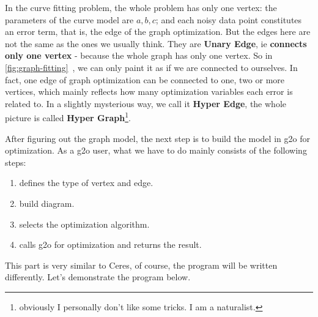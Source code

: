    In the curve fitting problem, the whole problem has only one vertex: the parameters of the curve model are $a, b, c$; and each noisy data point constitutes an error term, that is, the edge of the graph optimization. But the edges here are not the same as the ones we usually think. They are \textbf{Unary Edge}, ie \textbf{connects only one vertex} - because the whole graph has only one vertex. So in \autoref{fig:graph-fitting}~, we can only paint it as if we are connected to ourselves. In fact, one edge of graph optimization can be connected to one, two or more vertices, which mainly reflects how many optimization variables each error is related to. In a slightly mysterious way, we call it \textbf{Hyper Edge}, the whole picture is called \textbf{Hyper Graph}\footnote{ obviously I personally don't like some tricks. I am a naturalist. }.
    
    After figuring out the graph model, the next step is to build the model in g2o for optimization. As a g2o user, what we have to do mainly consists of the following steps:
    \begin{enumerate}
        \item defines the type of vertex and edge.
        \item build diagram.
        \item selects the optimization algorithm.
        \item calls g2o for optimization and returns the result.
        \end{enumerate}
        
        This part is very similar to Ceres, of course, the program will be written differently. Let's demonstrate the program below.

